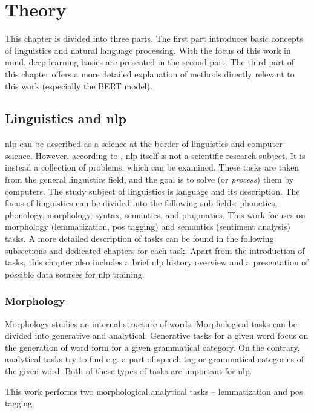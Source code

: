 \chapter{Theory}
\label{chap:theandme}
This chapter is divided into three parts. The first part introduces basic concepts of linguistics and natural language processing. With the focus of this work in mind, deep learning basics are presented in the second part. The third part of this chapter offers a more detailed explanation of methods directly relevant to this work (especially the BERT model).

\section{Linguistics and \acrlong{nlp}}
\acrfull{nlp} can be described as a science at the border of linguistics and computer science. However, according to \citep{Wilks}, \acrshort{nlp} itself is not a scientific research subject. It is instead a collection of problems, which can be examined. These tasks are taken from the general linguistics field, and the goal is to solve (or \textit{process}) them by computers. The study subject of linguistics is language and its description. The focus of linguistics can be divided into the following sub-fields: phonetics, phonology, morphology, syntax, semantics, and pragmatics. This work focuses on morphology (lemmatization, \acrfull{pos} tagging) and semantics (sentiment analysis) tasks. A more detailed description of tasks can be found in the following subsections and dedicated chapters for each task. Apart from the introduction of tasks, this chapter also includes a brief \acrshort{nlp} history overview and a presentation of possible data sources for \acrshort{nlp} training.

\subsection{Morphology}
Morphology studies an internal structure of words. Morphological tasks can be divided into generative and analytical. Generative tasks for a given word focus on the generation of word form for a given grammatical category. On the contrary, analytical tasks try to find  e.g. a part of speech tag or grammatical categories of the given word. Both of these types of tasks are important for \acrshort{nlp}. 
\par
This work performs two morphological analytical tasks -- lemmatization and \acrfull{pos} tagging.

